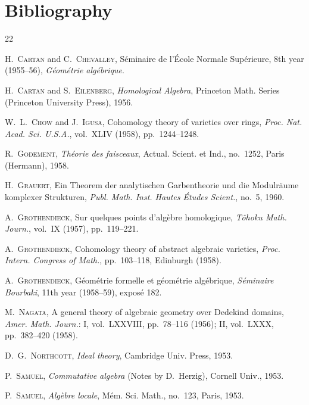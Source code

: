 \clearpage
{}
{}
\section*{Bibliography}

\begin{thebibliography}{22}

H.~\textsc{Cartan} and C.~\textsc{Chevalley},
Séminaire de l'École Normale Supérieure,
8th year (1955--56), \emph{Géométrie algébrique}.

H.~\textsc{Cartan} and S.~\textsc{Eilenberg},
\emph{Homological Algebra}, Princeton Math. Series (Princeton University
Press), 1956.

W.~L.~\textsc{Chow} and J.~\textsc{Igusa},
Cohomology theory of varieties over rings,
\emph{Proc. Nat. Acad. Sci. U.S.A.}, vol.~XLIV (1958), pp.~1244--1248.

R.~\textsc{Godement}, \emph{Théorie des faisceaux}, Actual. Scient. et Ind.,
no.~1252, Paris (Hermann), 1958.

H.~\textsc{Grauert},
Ein Theorem der analytischen Garbentheorie und die Modulräume komplexer
Strukturen, \emph{Publ. Math. Inst. Hautes Études Scient.},
no.~5, 1960.

A.~\textsc{Grothendieck}, Sur quelques points d'algèbre homologique,
\emph{Tôhoku Math. Journ.}, vol.~IX (1957), pp.~119--221.

A.~\textsc{Grothendieck},
Cohomology theory of abstract algebraic varieties,
\emph{Proc. Intern. Congress of Math.}, pp.~103--118, Edinburgh (1958).

A.~\textsc{Grothendieck},
Géométrie formelle et géométrie algébrique,
\emph{Séminaire Bourbaki}, 11th year (1958--59), exposé 182.

M.~\textsc{Nagata},
A general theory of algebraic geometry over Dedekind domains,
\emph{Amer. Math. Journ.}: I, vol.~LXXVIII, pp.~78--116 (1956); II, vol.~LXXX,
pp.~382--420 (1958).

D.~G.~\textsc{Northcott}, \emph{Ideal theory}, Cambridge Univ. Press, 1953.

P.~\textsc{Samuel}, \emph{Commutative algebra} (Notes by D.~Herzig), Cornell
Univ., 1953.

P.~\textsc{Samuel}, \emph{Algèbre locale}, Mém. Sci. Math.,
no.~123, Paris, 1953.


\end{thebibliography}
